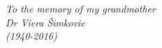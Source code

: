 \begin{center}
    \thispagestyle{empty}
    \vspace*{\fill}
    \textit{To the memory of my grandmother \\
                Dr Viera \v{S}imkovic \\
                       (1940-2016)
           }
    \vspace*{\fill}
\end{center}
